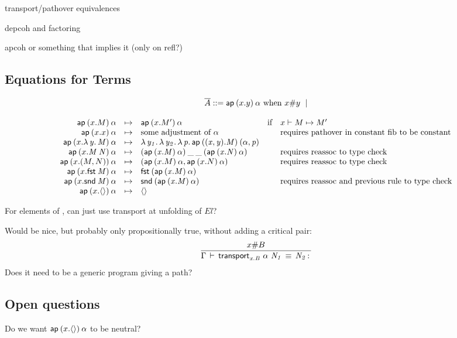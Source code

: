 transport/pathover equivalences

depcoh and factoring

apcoh or something that implies it (only on refl?)

\subsection{Equations for Terms}

\begin{small}
\[
\begin{array}{l}
\overline{A} ::= \mathsf{ap} \: {(x.y)} \: {\alpha} \text{ when $x \# y$ } \mid \\
\end{array}
\]
\end{small}

\begin{small}
\[
\begin{array}{rclll}
\mathsf{ap} \: {(x.M)} \: {\alpha} & \mapsto & \mathsf{ap} \: {(x.M')} \: {\alpha} & \text{if} & x \vdash M \mapsto M'\\ 
\mathsf{ap} \: {(x.x)} \: {\alpha} & \mapsto & \text{some adjustment of $\alpha$} & & \text{requires pathover in constant fib to be constant}\\ 
\mathsf{ap} \: {(x.\mathit{\lambda\,y.\,M})} \: {\alpha} & \mapsto & \mathit{\lambda\,y_1.\,\mathit{\lambda\,y_2.\,\mathit{\lambda\,p.\,\mathsf{ap} \: {((x,y).M)} \: {(\alpha,p)}}}}\\
\mathsf{ap} \: {(x.\mathit{M \: N})} \: {\alpha} & \mapsto & \mathit{(\mathsf{ap} \: {(x.M)} \: {\alpha}) \: \_ \: \_ \: (\mathsf{ap} \: {(x.N)} \: {\alpha})} & &\text{requires reassoc to type check}\\ 
\mathsf{ap} \: {(x.(M,N))} \: {\alpha} & \mapsto & (\mathsf{ap} \: {(x.M)} \: {\alpha}, \mathsf{ap} \: {(x.N)} \: {\alpha}) & & \text{requires reassoc to type check}\\ 
\mathsf{ap} \: {(x.\mathit{\mathsf{fst} \: M})} \: {\alpha} & \mapsto & \mathit{\mathsf{fst} \: (\mathsf{ap} \: {(x.M)} \: {\alpha})} & & \\ 
\mathsf{ap} \: {(x.\mathit{\mathsf{snd} \: M})} \: {\alpha} & \mapsto & \mathit{\mathsf{snd} \: (\mathsf{ap} \: {(x.M)} \: {\alpha})} & & \text{requires reassoc and previous rule to type check}\\ 
\mathsf{ap} \: {(x.\mathsf{\langle\rangle})} \: {\alpha} & \mapsto & \mathsf{\langle\rangle} & \\ 
\end{array}
\]
\end{small}

For elements of \set, can just use transport at unfolding of $El$?  

Would be nice, but probably only propositionally true, without adding a
critical pair:
\[
\infer{\deqtm{\Gamma}{\transport{x.B}{\alpha}{N_1}}{N_2}{}}
      {x \# B}
\]
Does it need to be a generic program giving a path?

\subsection{Open questions}

Do we want $\mathsf{ap} \: {(x.\mathsf{\langle\rangle})} \: {\alpha}$ to be neutral?


